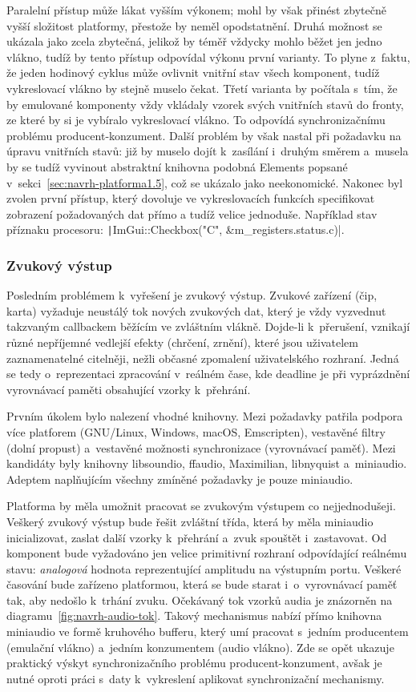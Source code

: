 Paralelní přístup může lákat vyšším výkonem; mohl by však přinést zbytečně vyšší složitost platformy, přestože by neměl opodstatnění. Druhá možnost se ukázala jako zcela zbytečná, jelikož by téměř vždycky mohlo běžet jen jedno vlákno, tudíž by tento přístup odpovídal výkonu první varianty. To plyne z~faktu, že jeden hodinový cyklus může ovlivnit vnitřní stav všech komponent, tudíž vykreslovací vlákno by stejně muselo čekat. Třetí varianta by počítala s~tím, že by emulované komponenty vždy vkládaly vzorek svých vnitřních stavů do fronty, ze které by si je vybíralo vykreslovací vlákno. To odpovídá synchronizačnímu problému producent-konzument. Další problém by však nastal při požadavku na úpravu vnitřních stavů: již by muselo dojít k~zasílání i~druhým směrem a~musela by se tudíž vyvinout abstraktní knihovna podobná Elements popsané v~sekci~\ref{sec:navrh-platforma1.5}, což se ukázalo jako neekonomické. Nakonec byl zvolen první přístup, který dovoluje ve vykreslovacích funkcích specifikovat zobrazení požadovaných dat přímo a tudíž velice jednoduše. Například stav příznaku procesoru: \texttt|ImGui::Checkbox("C", &m_registers.status.c)|.

\subsubsection{Zvukový výstup}
Posledním problémem k~vyřešení je zvukový výstup. Zvukové zařízení (čip, karta) vyžaduje neustálý tok nových zvukových dat, který je vždy vyzvednut takzvaným callbackem běžícím ve zvláštním vlákně. Dojde-li k~přerušení, vznikají různé nepříjemné vedlejší efekty (chrčení, zrnění), které jsou uživatelem zaznamenatelné citelněji, nežli občasné zpomalení uživatelského rozhraní. Jedná se tedy o~reprezentaci zpracování v~reálném čase, kde deadline je při vyprázdnění vyrovnávací paměti obsahující vzorky k~přehrání.

Prvním úkolem bylo nalezení vhodné knihovny. Mezi požadavky patřila podpora více platforem (GNU/Linux, Windows, macOS, Emscripten), vestavěné filtry (dolní propust) a~vestavěné možnosti synchronizace (vyrovnávací paměť). Mezi kandidáty byly knihovny libsoundio, ffaudio, Maximilian, libnyquist a~miniaudio. Adeptem naplňujícím všechny zmíněné požadavky je pouze miniaudio.

Platforma by měla umožnit pracovat se zvukovým výstupem co nejjednodušeji. Veškerý zvukový výstup bude řešit zvláštní třída, která by měla miniaudio inicializovat, zaslat další vzorky k~přehrání a~zvuk spouštět i~zastavovat. Od komponent bude vyžadováno jen velice primitivní rozhraní odpovídající reálnému stavu: \emph{analogová} hodnota reprezentující amplitudu na výstupním portu. Veškeré časování bude zařízeno platformou, která se bude starat i~o~vyrovnávací paměť tak, aby nedošlo k~trhání zvuku. Očekávaný tok vzorků audia je znázorněn na diagramu~\ref{fig:navrh-audio-tok}. Takový mechanismus nabízí přímo knihovna miniaudio ve formě kruhového bufferu, který umí pracovat s~jedním producentem (emulační vlákno) a~jedním konzumentem (audio vlákno). Zde se opět ukazuje praktický výskyt synchronizačního problému producent-konzument, avšak je nutné oproti práci s~daty k~vykreslení aplikovat synchronizační mechanismy.

